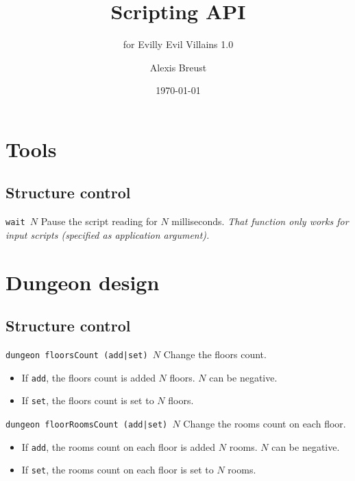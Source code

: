 \documentclass[10pt,a4paper]{scrartcl}
\title{Scripting API}
\subtitle{for Evilly Evil Villains 1.0}
\author{Alexis Breust}
\date{\today}
\newenvironment{apiCode}[1]
{ \begin{lrbox}{\mybox} \begin{minipage}{0.9\textwidth} {\color{Mahogany} \small\texttt{#1}} \vspace{8pt} \newline }
{ \end{minipage} \end{lrbox}\fbox{\usebox{\mybox}} \newline\vspace{4pt}\newline }
\begin{document}
\maketitle

\section{Tools}
\subsection{Structure control}
\begin{apiCode}{wait $N$}
Pause the script reading for $N$ milliseconds.\newline
\textit{That function only works for input scripts (specified as application argument).}
\end{apiCode}

\section{Dungeon design}
\subsection{Structure control}
\begin{apiCode}{dungeon floorsCount (add|set) $N$}
Change the floors count.
\begin{itemize}
\itemsep 0em
\item If \verb#add#, the floors count is added $N$ floors. $N$ can be negative.
\item If \verb#set#, the floors count is set to $N$ floors.
\end{itemize}
\end{apiCode}
\begin{apiCode}{dungeon floorRoomsCount (add|set) $N$}
Change the rooms count on each floor.
\begin{itemize}
\itemsep 0em
\item If \verb#add#, the rooms count on each floor is added $N$ rooms. $N$ can be negative.
\item If \verb#set#, the rooms count on each floor is set to $N$ rooms.
\end{itemize}
\end{apiCode}
\end{document}
